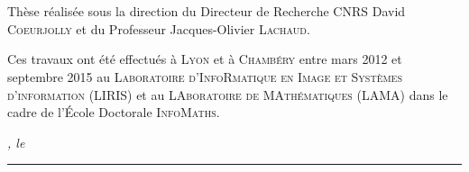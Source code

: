 %
%
%
\chapter*{}%
\label{sec:declaration}
\thispagestyle{empty}

\bigskip
\vfill

\noindent Thèse réalisée sous la direction du Directeur de Recherche CNRS David
\textsc{Coeurjolly} et du Professeur Jacques-Olivier \textsc{Lachaud}.

\noindent Ces travaux ont été effectués à \textsc{Lyon} et à \textsc{Chambéry}
entre mars 2012 et septembre 2015 au \textsc{Laboratoire d'InfoRmatique en Image
et Systèmes d'information} (\textsc{LIRIS}) et au \textsc{LAboratoire de
MAthématiques} (\textsc{LAMA}) dans le cadre de l'École Doctorale
\textsc{InfoMaths}.

\noindent\textit{\thesisUniversityCity, le \thesisDate}

\smallskip




\begin{flushright}
	\begin{minipage}{5cm}
		\rule{\textwidth}{1pt}
	\end{minipage}\\
	\begin{minipage}{8cm}
		\centering\thesisTitle
	\end{minipage}
\end{flushright}



